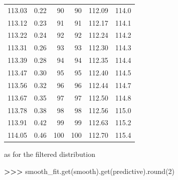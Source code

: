 \documentclass[
]{article}
\newenvironment{Shaded}{\begin{snugshade}}{\end{snugshade}}
\newcommand{\BuiltInTok}[1]{#1}
\newcommand{\DecValTok}[1]{\textcolor[rgb]{0.00,0.00,0.81}{#1}}
\newcommand{\NormalTok}[1]{#1}
\newcommand{\OperatorTok}[1]{\textcolor[rgb]{0.81,0.36,0.00}{\textbf{#1}}}
\newcommand{\StringTok}[1]{\textcolor[rgb]{0.31,0.60,0.02}{#1}}
\begin{document}
\begin{longtable}[]{@{}rrrrrr@{}}
113.03 & 0.22 & 90 & 90 & 112.09 & 114.0 \\
113.12 & 0.23 & 91 & 91 & 112.17 & 114.1 \\
113.22 & 0.24 & 92 & 92 & 112.24 & 114.2 \\
113.31 & 0.26 & 93 & 93 & 112.30 & 114.3 \\
113.39 & 0.28 & 94 & 94 & 112.35 & 114.4 \\
113.47 & 0.30 & 95 & 95 & 112.40 & 114.5 \\
113.56 & 0.32 & 96 & 96 & 112.44 & 114.7 \\
113.67 & 0.35 & 97 & 97 & 112.50 & 114.8 \\
113.78 & 0.38 & 98 & 98 & 112.56 & 115.0 \\
113.91 & 0.42 & 99 & 99 & 112.63 & 115.2 \\
114.05 & 0.46 & 100 & 100 & 112.70 & 115.4 \\
\bottomrule
\end{longtable}

as for the filtered distribution

\begin{Shaded}
\begin{Highlighting}[]
\OperatorTok{\textgreater{}\textgreater{}\textgreater{}}\NormalTok{ smooth\_fit.get(}\StringTok{\textquotesingle{}smooth\textquotesingle{}}\NormalTok{).get(}\StringTok{\textquotesingle{}predictive\textquotesingle{}}\NormalTok{).}\BuiltInTok{round}\NormalTok{(}\DecValTok{2}\NormalTok{)}
\end{Highlighting}
\end{Shaded}
\end{document}
